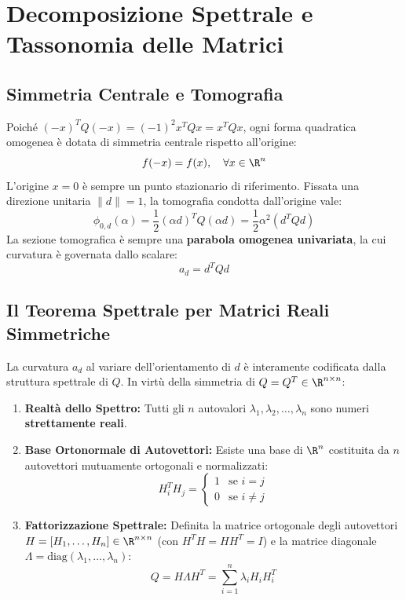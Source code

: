 \FloatBarrier
\section{Decomposizione Spettrale e Tassonomia delle Matrici}
\label{sec:opt-decomposizione-spettrale-tassonomia}

\subsection{Simmetria Centrale e Tomografia}
Poich\'e $(-x)^T Q (-x) = (-1)^2 x^T Q x = x^T Q x$, ogni forma quadratica omogenea \`e dotata di simmetria centrale rispetto all'origine:
\begin{equation}
f(-x) = f(x), \quad \forall x \in \R^n
\end{equation}
L'origine $x = 0$ \`e sempre un punto stazionario di riferimento. Fissata una direzione unitaria $\|d\| = 1$, la tomografia condotta dall'origine vale:
\begin{equation}
\phi_{0, d}(\alpha) = \frac{1}{2} (\alpha d)^T Q (\alpha d) = \frac{1}{2} \alpha^2 (d^T Q d)
\end{equation}
La sezione tomografica \`e sempre una \textbf{parabola omogenea univariata}, la cui curvatura \`e governata dallo scalare:
\begin{equation}
a_d = d^T Q d
\end{equation}

\subsection{Il Teorema Spettrale per Matrici Reali Simmetriche}
La curvatura $a_d$ al variare dell'orientamento di $d$ \`e interamente codificata dalla struttura spettrale di $Q$. In virt\`u della simmetria di $Q = Q^T \in \R^{n \times n}$:
\begin{enumerate}
    \item \textbf{Realt\`a dello Spettro:} Tutti gli $n$ autovalori $\lambda_1, \lambda_2, \dots, \lambda_n$ sono numeri \textbf{strettamente reali}.
    \item \textbf{Base Ortonormale di Autovettori:} Esiste una base di $\R^n$ costituita da $n$ autovettori mutuamente ortogonali e normalizzati:
    \begin{equation}
    H_i^T H_j = \begin{cases} 1 & \text{se } i = j \\ 0 & \text{se } i \neq j \end{cases}
    \end{equation}
    \item \textbf{Fattorizzazione Spettrale:} Definita la matrice ortogonale degli autovettori $H = [H_1, \dots, H_n] \in \R^{n \times n}$ (con $H^T H = H H^T = I$) e la matrice diagonale $\Lambda = \text{diag}(\lambda_1, \dots, \lambda_n)$:
    \begin{equation}
    Q = H \Lambda H^T = \sum_{i=1}^n \lambda_i H_i H_i^T
    \end{equation}
\end{enumerate}

